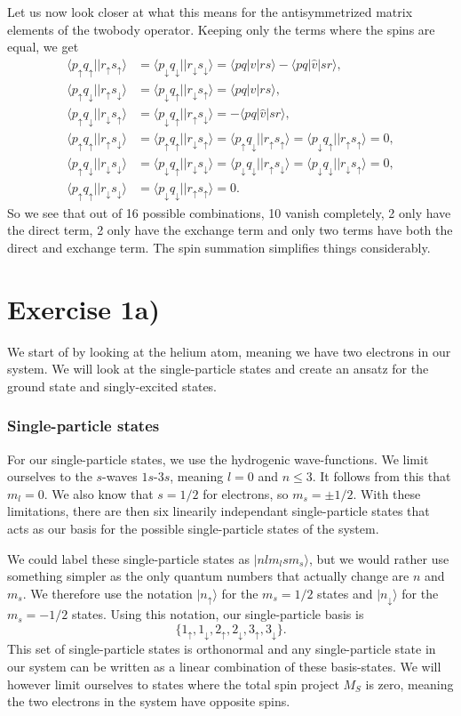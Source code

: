 \documentclass[a4paper, 11pt, notitlepage, english]{article}
\newcommand{\ket}[1]{|#1 \rangle}
\newcommand{\brakket}[2]{\langle #1 || #2 \rangle}
\newcommand{\op}[1]{\hat{#1}}
\newcommand{\braopket}[3]{\langle #1 | {#2} | #3 \rangle}
\renewcommand{\d}{{\rm d}}
\renewcommand{\u}{\uparrow}
\renewcommand{\d}{\downarrow}
\begin{document}
Let us now look closer at what this means for the antisymmetrized matrix elements of the twobody operator. Keeping only the terms where the spins are equal, we get
\begin{align*}
\brakket{p_\u q_\u}{r_\u s_\u}	&= \brakket{p_\d q_\d}{r_\d s_\d} = \braopket{pq}{\op{v}}{rs} - \braopket{pq}{\op{v}}{sr}, \\
\brakket{p_\u q_\d}{r_\u s_\d}	&= \brakket{p_\d q_\u}{r_\d s_\u} = \braopket{pq}{\op{v}}{rs}, \\
\brakket{p_\u q_\d}{r_\d s_\u}	&= \brakket{p_\d q_\u}{r_\u s_\d} = -\braopket{pq}{\op{v}}{sr}, \\
\brakket{p_\u q_\u}{r_\u s_\d}	&= \brakket{p_\u q_\u}{r_\d s_\u} = \brakket{p_\u q_\d}{r_\u s_\u} = \brakket{p_\d q_\u}{r_\u s_\u} = 0, \\
\brakket{p_\u q_\d}{r_\d s_\d}	&= \brakket{p_\d q_\u}{r_\d s_\d} = \brakket{p_\d q_\d}{r_\u s_\d} = \brakket{p_\d q_\d}{r_\d s_\u} = 0, \\
\brakket{p_\u q_\u}{r_\d s_\d}	&= \brakket{p_\d q_\d}{r_\u s_\u} = 0.
\end{align*}
So we see that out of 16 possible combinations, 10 vanish completely, 2 only have the direct term, 2 only have the exchange term and only two terms have both the direct and exchange term. The spin summation simplifies things considerably.

\clearpage

\section*{Exercise 1a)}
We start of by looking at the helium atom, meaning we have two electrons in our system. We will look at the single-particle states and create an ansatz for the ground state and singly-excited states.

\subsubsection*{Single-particle states}
For our single-particle states, we use the hydrogenic wave-functions. We limit ourselves to the $s$-waves $1s$-$3s$, meaning $l=0$ and $n\leq3$. It follows from this that $m_l = 0$. We also know that $s=1/2$ for electrons, so $m_s = \pm 1/2$. With these limitations, there are then six linearily independant single-particle states that acts as our basis for the possible single-particle states of the system. 

We could label these single-particle states as $\ket{n l m_l s m_s}$, but we would rather use something simpler as the only quantum numbers that actually change are $n$ and $m_s$. We therefore use the notation $\ket{n_\u}$ for the $m_s=1/2$ states and $\ket{n_\d}$ for the $m_s=-1/2$ states. Using this notation, our single-particle basis is
$$\{1_\u, 1_\d, 2_\u, 2_\d, 3_\u, 3_\d \}.$$
This set of single-particle states is orthonormal and any single-particle state in our system can be written as a linear combination of these basis-states. We will however limit ourselves to states where the total spin project $M_S$ is zero, meaning the two electrons in the system have opposite spins.
\end{document}
